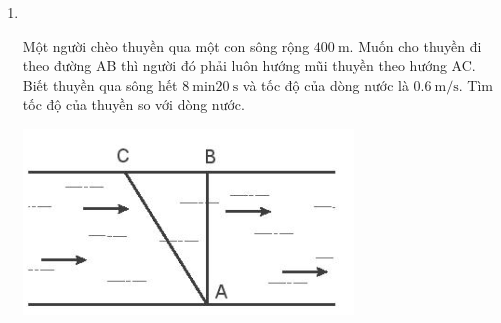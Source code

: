 \begin{enumerate}[label=\bfseries Bài \arabic*:]
\item {}\\
{Một người chèo thuyền qua một con sông rộng $\SI{400}{\meter}$. Muốn cho thuyền đi theo đường AB thì người đó phải luôn hướng mũi thuyền theo hướng AC. Biết thuyền qua sông hết $\SI{8}{\minute} \SI{20}{\second}$ và tốc độ của dòng nước là $\SI{0.6}{\meter/\second}$. Tìm tốc độ của thuyền so với dòng nước.
	\begin{center}
		\includegraphics[width=0.35\linewidth]{../figs/VN10-2023-PH-TP0002-7}
	\end{center}
	
}

\end{enumerate}
